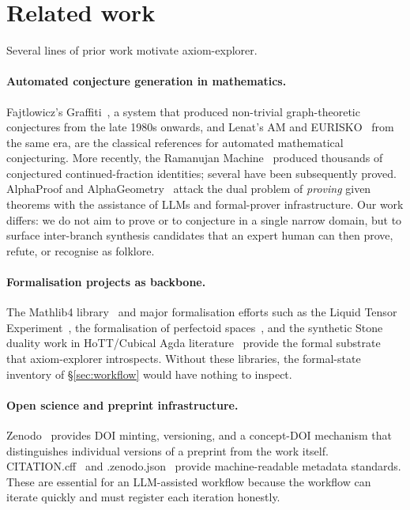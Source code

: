 \documentclass[11pt]{article}
\theoremstyle{definition}
\theoremstyle{remark}
\begin{document}
\section{Related work}\label{sec:related}

Several lines of prior work motivate axiom-explorer.

\paragraph{Automated conjecture generation in mathematics.} Fajtlowicz's
Graffiti~\cite{Fajtlowicz1988Graffiti}, a system that produced
non-trivial graph-theoretic conjectures from the late 1980s onwards, and
Lenat's AM and EURISKO~\cite{Lenat1976AM} from the same era, are the
classical references for automated mathematical conjecturing. More
recently, the Ramanujan Machine~\cite{RamanujanMachine2021Nature}
produced thousands of conjectured continued-fraction identities; several
have been subsequently proved. AlphaProof and
AlphaGeometry~\cite{DeepMind2024AlphaGeometry, DeepMind2024AlphaProof}
attack the dual problem of \emph{proving} given theorems with the
assistance of LLMs and formal-prover infrastructure. Our work differs:
we do not aim to prove or to conjecture in a single narrow domain, but
to surface inter-branch synthesis candidates that an expert human can
then prove, refute, or recognise as folklore.

\paragraph{Formalisation projects as backbone.} The Mathlib4
library~\cite{Mathlib2020Community} and major formalisation efforts such
as the Liquid Tensor Experiment~\cite{Scholze2022LTE,
LeanCommunity2022LTEFinal}, the formalisation of perfectoid
spaces~\cite{BuzzardCommelinMassot2020Perfectoid}, and the synthetic
Stone duality work in HoTT/Cubical Agda
literature~\cite{CherubiniCoquandGeerligsMoeneclaey2024SSD,
SyntheticZariskiRepo} provide the formal substrate that axiom-explorer
introspects. Without these libraries, the formal-state inventory of
\S\ref{sec:workflow} would have nothing to inspect.

\paragraph{Open science and preprint infrastructure.}
Zenodo~\cite{ZenodoCERN} provides DOI minting, versioning, and a
concept-DOI mechanism that distinguishes individual versions of a
preprint from the work itself. CITATION.cff~\cite{CITATIONcff} and
.zenodo.json~\cite{ZenodoMetadata} provide
machine-readable metadata standards. These are essential for an
LLM-assisted workflow because the workflow can iterate quickly and must
register each iteration honestly.
\end{document}
